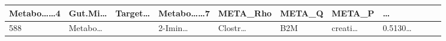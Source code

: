 \documentclass[
]{article}
\begin{document}
\begin{longtable}[]{@{}lllllllllll@{}}
\begin{minipage}[b]{0.09\columnwidth}
Metabo\ldots\ldots4\strut
\end{minipage} & \begin{minipage}[b]{0.07\columnwidth}\raggedright
Gut.Mi\ldots{}\strut
\end{minipage} & \begin{minipage}[b]{0.07\columnwidth}\raggedright
Target\ldots{}\strut
\end{minipage} & \begin{minipage}[b]{0.09\columnwidth}\raggedright
Metabo\ldots\ldots7\strut
\end{minipage} & \begin{minipage}[b]{0.07\columnwidth}\raggedright
META\_Rho\strut
\end{minipage} & \begin{minipage}[b]{0.07\columnwidth}\raggedright
META\_Q\strut
\end{minipage} & \begin{minipage}[b]{0.07\columnwidth}\raggedright
META\_P\strut
\end{minipage} & \begin{minipage}[b]{0.03\columnwidth}\raggedright
\ldots{}\strut
\end{minipage}\tabularnewline
\midrule
\endhead
\begin{minipage}[t]{0.03\columnwidth}\raggedright
588\strut
\end{minipage} & \begin{minipage}[t]{0.07\columnwidth}\raggedright
Metabo\ldots{}\strut
\end{minipage} & \begin{minipage}[t]{0.07\columnwidth}\raggedright
\strut
\end{minipage} & \begin{minipage}[t]{0.09\columnwidth}\raggedright
2-Imin\ldots{}\strut
\end{minipage} & \begin{minipage}[t]{0.07\columnwidth}\raggedright
Clostr\ldots{}\strut
\end{minipage} & \begin{minipage}[t]{0.07\columnwidth}\raggedright
B2M\strut
\end{minipage} & \begin{minipage}[t]{0.09\columnwidth}\raggedright
creati\ldots{}\strut
\end{minipage} & \begin{minipage}[t]{0.07\columnwidth}\raggedright
0.5130\ldots{}\strut
\end{minipage} & \begin{minipage}[t]{0.07\columnwidth}\raggedright

\end{minipage}
\end{longtable}
\end{document}
